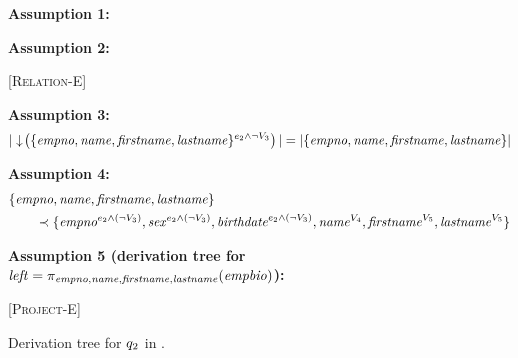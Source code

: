 \begin{figure}
\caption[Example of derivation tree to determine the type of a query]{Derivation tree for \ensuremath{\vQ_2} in .}

\scriptsize
\textbf{Assumption 1:}
\begin{prooftree*}
\end{prooftree*}

\medskip
\textbf{Assumption 2:}
\begin{prooftree*}
 [\textsc{Relation-E}] {\env [\dimMeta_2 \wedge (\neg \vThree)] [\vSch_2] {\empbio} {\annot [\dimMeta_2 \wedge (\neg \vThree)] {(\empno, \sex, \birthdate, \annot [\vFour] \name, \annot [\vFive] \fname, \annot [\vFive] \lname)}}}
\end{prooftree*}

\medskip
\textbf{Assumption 3:}
\begin{alignat*}{1}
|\pushIn { \{ \empno, \name, \fname, \lname  \}^{\dimMeta_2 \wedge \neg \vThree} } |
=|{ \{ \empno, \name, \fname, \lname  \} } |
\end{alignat*}

\medskip
\textbf{Assumption 4:}
\begin{alignat*}{1}
& { \{ \empno, \name, \fname, \lname  \} } \\
&\qquad \prec {\{\annot [\dimMeta_2 \wedge (\neg \vThree)] \empno, \annot [\dimMeta_2 \wedge (\neg \vThree)] \sex, \annot [\dimMeta_2 \wedge (\neg \vThree)] \birthdate, \annot [\vFour] \name, \annot [\vFive] \fname, \annot [\vFive] \lname\} } 
\end{alignat*}

\medskip
\textbf{Assumption 5 (derivation tree for $\mathit{left} = {\pi_{\empno, \name, \fname, \lname} (\empbio)}$):}
\begin{prooftree*}
 [\textsc{Project-E}] { {\annot [\dimMeta_2 \wedge (\neg \vThree)] {( \empno, \annot [\vFour] \name, \annot [\vFive] \fname, \annot [\vFour] \lname)}}}
\end{prooftree*}


\end{figure}
